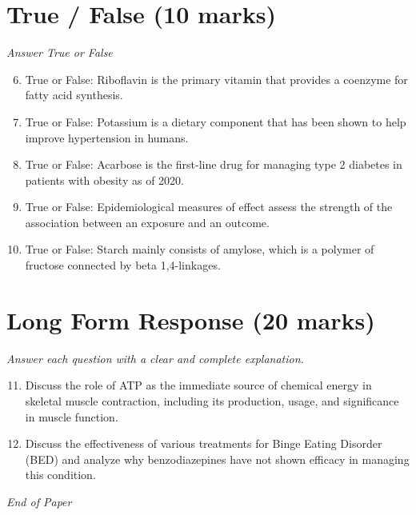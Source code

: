 \documentclass[12pt]{article}
\begin{document}
\section*{True / False (10 marks)}
\textit{Answer True or False}
\begin{enumerate}[label=\arabic*.]
\setcounter{enumi}{5}
\item True or False: Riboflavin is the primary vitamin that provides a coenzyme for fatty acid synthesis.
\item True or False: Potassium is a dietary component that has been shown to help improve hypertension in humans.
\item True or False: Acarbose is the first-line drug for managing type 2 diabetes in patients with obesity as of 2020.
\item True or False: Epidemiological measures of effect assess the strength of the association between an exposure and an outcome.
\item True or False: Starch mainly consists of amylose, which is a polymer of fructose connected by beta 1,4-linkages.
\end{enumerate}

\section*{Long Form Response (20 marks)}
\textit{Answer each question with a clear and complete explanation.}
\begin{enumerate}[label=\arabic*.]
\setcounter{enumi}{10}
\item Discuss the role of ATP as the immediate source of chemical energy in skeletal muscle contraction, including its production, usage, and significance in muscle function.
\item Discuss the effectiveness of various treatments for Binge Eating Disorder (BED) and analyze why benzodiazepines have not shown efficacy in managing this condition.
\end{enumerate}

\vfill
\noindent\textit{End of Paper}
\end{document}
